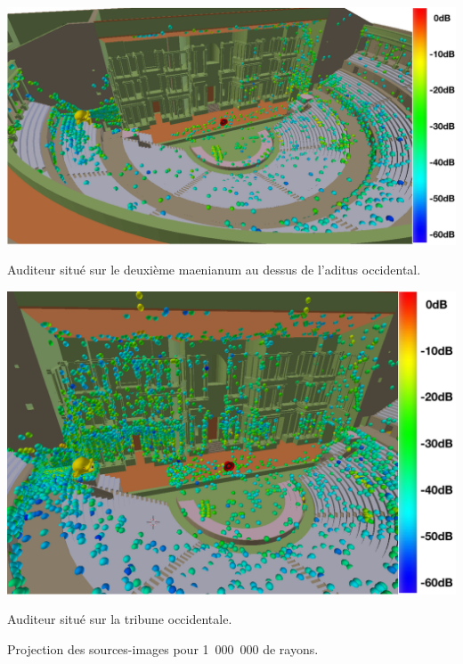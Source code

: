\begin{figureth}
\begin{subfigureth}{0.9\textwidth}
	\includegraphics[width=\linewidth]{images/Listener11}
	\caption{Auditeur situé sur le deuxième \gls{maenianum} au dessus de l'\gls{aditus} occidental.}
	\label{listener11}
\end{subfigureth}
\par\vspace{0.5cm}
\begin{subfigureth}{0.9\textwidth}
	\includegraphics[width=\linewidth]{images/Listener10}
		\caption{Auditeur situé sur la tribune occidentale.}
	\label{listener10}
	\end{subfigureth}
	\caption{Projection des sources-images pour 1~000~000 de rayons.}
\end{figureth}
%
